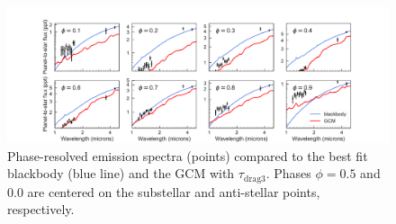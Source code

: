 \documentclass[twocolumn]{aastex61}
\begin{document}
\begin{figure}
\includegraphics[width = 1.0\textwidth]{Figures/emission_spectra.pdf}
\caption{Phase-resolved emission spectra (points) compared to the best fit blackbody (blue line) and the GCM with $\tau_\mathrm{drag3}$. Phases $\phi = 0.5$ and $0.0$ are centered on the substellar and anti-stellar points, respectively.}
\label{fig:spectra}
\end{figure}
\end{document}
